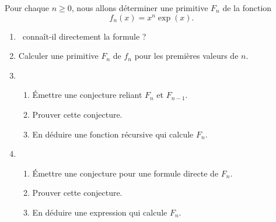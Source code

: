 \begin{frame}
\begin{tp}
Pour chaque $n\ge 0$, nous allons déterminer une primitive $F_n$ de la fonction 
$$f_n(x) = x^n \exp(x).$$

\begin{enumerate}
  \item \Sage\ connaît-il directement la formule ?
  
  \item Calculer une primitive $F_n$ de $f_n$ pour les premières valeurs de $n$.
  
   \item 
   \begin{enumerate}
     \item \'Emettre une conjecture reliant $F_n$ et $F_{n-1}$.
     \item Prouver cette conjecture.
     \item En déduire une fonction récursive qui calcule $F_n$.
   \end{enumerate}
  
  \item 
   \begin{enumerate}
     \item \'Emettre une conjecture pour une formule directe de $F_n$.
     \item Prouver cette conjecture.
     \item En déduire une expression qui calcule $F_n$.
   \end{enumerate}  
\end{enumerate} 
\end{tp}
\end{frame}



